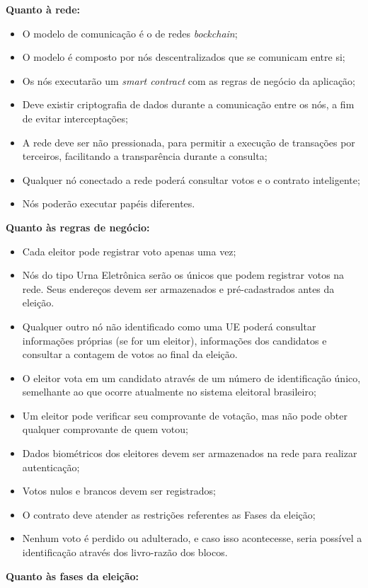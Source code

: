 \documentclass[portuguese]{textolivre}
\begin{document}
	\textbf{Quanto à rede: }
	\begin{itemize}
		\item O modelo de comunicação é o de redes \emph{bockchain};
		\item O modelo é composto por nós descentralizados que se comunicam entre si;
		\item Os nós executarão um \emph{smart contract} com as regras de negócio da aplicação;
		\item Deve existir criptografia de dados durante a comunicação entre os nós, a fim de evitar interceptações;
		\item A rede deve ser não pressionada, para permitir a execução de transações por terceiros, facilitando a transparência durante a consulta;
		\item Qualquer nó conectado a rede poderá consultar votos e o contrato inteligente;
		\item Nós poderão executar papéis diferentes.
	\end{itemize}
	\textbf{Quanto às regras de negócio: }
	\begin{itemize}
		\item Cada eleitor pode registrar voto apenas uma vez;
		\item Nós do tipo Urna Eletrônica serão os únicos que podem registrar votos na rede. Seus endereços devem ser armazenados e pré-cadastrados antes da eleição.
		\item Qualquer outro nó não identificado como uma UE poderá consultar informações próprias (se for um eleitor), informações dos candidatos e consultar a contagem de votos ao final da eleição.
		\item O eleitor vota em um candidato através de um número de identificação único, semelhante ao que ocorre atualmente no sistema eleitoral brasileiro;
		\item Um eleitor pode verificar seu comprovante de votação, mas não pode obter qualquer comprovante de quem votou;
		\item Dados biométricos dos eleitores devem ser armazenados na rede para realizar autenticação;
		\item Votos nulos e brancos devem ser registrados;
		\item O contrato deve atender as restrições referentes as Fases da eleição;
		\item Nenhum voto é perdido ou adulterado, e caso isso acontecesse, seria possível a identificação através dos livro-razão dos blocos.
	\end{itemize}
	\textbf{Quanto às fases da eleição: }
\end{document}
